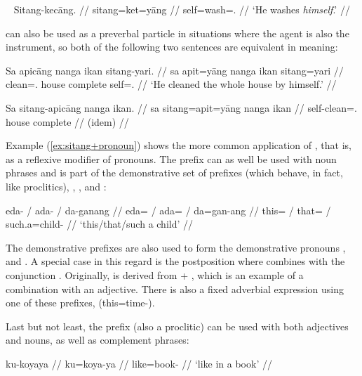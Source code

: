 \ex~\begingl
	\gla Sitang-kecāng. //
	\glb sitang=ket=yāng //
	\glc self=wash=\TsgM{}.\Aarg{} //
	\glft `He washes \emph{himself}.' //
\endgl\xe

 can also be used as a preverbal particle in situations
where the agent is also the instrument, so both of the following two sentences
are equivalent in meaning:

\pex
\a\label{ex:sitang+pronoun}\begingl
	\gla Sa apicāng nanga ikan sitang-yari. //
	\glb sa apit=yāng nanga ikan sitang=yari //
	\glc \PatT{} clean=\Tsg{}.\Aarg{} house complete 
		self=\TsgM{}.\Ins{} //
	\glft `He cleaned the whole house by himself.' //
\endgl

\a\begingl
	\gla Sa sitang-apicāng nanga ikan. //
	\glb sa sitang=apit=yāng nanga ikan //
	\glc \PatT{} self-clean=\Tsg{}.\Aarg{} house complete //
	\glft (idem) //
\endgl
\xe

\label{nounprefixes}
Example (\ref{ex:sitang+pronoun}) shows the more common application of 
, that is, as a reflexive modifier of pronouns. The 
prefix  can as well be used with noun phrases and is part of the 
demonstrative set of prefixes (which behave, in fact, like proclitics), 
, , and :

\ex\begingl
	\gla eda- / ada- / da-ganang //
	\glb eda= / ada= / da=gan-ang //
	\glc this= / that= / such.a=child-\Aarg{} //
	\glft `this/that/such a child' //
\endgl\xe

The demonstrative prefixes are also used to form the demonstrative 
pronouns , 
 and . A special case 
in this regard is the postposition  where  combines with the conjunction 
. Originally, 
 is derived from  + 
, which is an example of a combination 
with an adjective. There is also a fixed adverbial expression using one of 
these prefixes,  
(this=time-\Dat{}).

Last but not least, the prefix  (also a
proclitic) can be used with both adjectives and nouns, as well as
complement phrases:

\pex
\a\begingl
	\gla ku-koyaya //
	\glb ku=koya-ya //
	\glc like=book-\Loc{} //
	\glft `like in a book' //
\endgl


